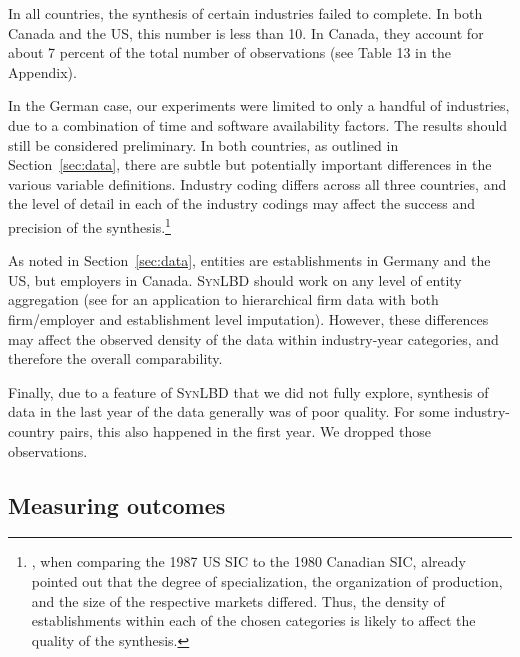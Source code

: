\documentclass[10pt]{article}
\newcommand{\SynLBD}{\textsc{SynLBD}}
\begin{document}
In all countries, the synthesis of certain industries failed to complete. In both Canada and the US, this number is less than 10. In Canada, they account for about 7 percent of the total number of observations (see Table 13
in the  Appendix).

In the German case, our experiments were limited to only a handful of industries, due to a combination of time and software availability factors. The results should still be considered preliminary. In both countries, as outlined in Section~\ref{sec:data}, there are subtle but potentially important differences in the various variable definitions. Industry coding differs across all three countries, and the level of detail in each of the industry codings may affect the success and precision of the synthesis.\footnote{\textcite{StatisticsCanada1991}, when comparing the 1987 US \ac{SIC} to the 1980 Canadian \ac{SIC},  already pointed out that the degree of specialization, the organization of production, and the size of the respective markets differed. Thus, the density of establishments within each of the chosen categories is likely to affect the quality of the synthesis.} 

As noted in Section~\ref{sec:data}, entities are establishments in Germany and the US, but employers in Canada. \SynLBD{} should work on any level of entity aggregation (see \citet{RePEc:cen:wpaper:14-12} for an application to hierarchical firm data with both firm/employer and establishment level imputation). However, these differences may affect the observed density of the data within industry-year categories, and therefore the overall comparability. 

Finally, due to a feature of \SynLBD{} that we did not fully explore, synthesis of data in the last year of the data generally was of poor quality. For some industry-country pairs, this also happened in the first year. We dropped those observations. 

\subsection{Measuring outcomes}
\end{document}

